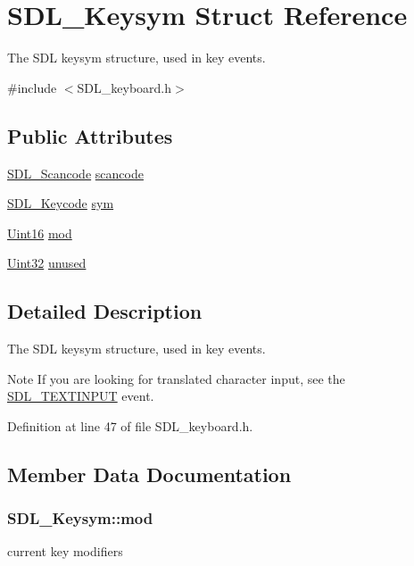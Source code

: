 \hypertarget{struct_s_d_l___keysym}{\section{S\-D\-L\-\_\-\-Keysym Struct Reference}
\label{struct_s_d_l___keysym}
}


The S\-D\-L keysym structure, used in key events.  




{\ttfamily \#include $<$S\-D\-L\-\_\-keyboard.\-h$>$}

\subsection*{Public Attributes}
\begin{DoxyCompactItemize}
\item 
\hyperlink{_s_d_l__scancode_8h_a82ab7cff701034fb40a47b5b3a02777b}{S\-D\-L\-\_\-\-Scancode} \hyperlink{struct_s_d_l___keysym_ad47e9120a511e2efc7ec0c6d8a5ec51e}{scancode}
\item 
\hyperlink{_s_d_l__keycode_8h_ae9265f064f13f0f74dfca26a67875171}{S\-D\-L\-\_\-\-Keycode} \hyperlink{struct_s_d_l___keysym_a082ff1fd787b79fa6c3a445deb225f08}{sym}
\item 
\hyperlink{_s_d_l__stdinc_8h_a31fcc0a076c9068668173ee26d33e42b}{Uint16} \hyperlink{struct_s_d_l___keysym_ab519d1b8a9939d3d035f7103f3208291}{mod}
\item 
\hyperlink{_s_d_l__stdinc_8h_add440eff171ea5f55cb00c4a9ab8672d}{Uint32} \hyperlink{struct_s_d_l___keysym_ab1d0a50cc619966fb06b92e15cc46dd9}{unused}
\end{DoxyCompactItemize}


\subsection{Detailed Description}
The S\-D\-L keysym structure, used in key events. 

\begin{DoxyNote}{Note}
If you are looking for translated character input, see the \hyperlink{_s_d_l__events_8h_a3b589e89be6b35c02e0dd34a55f3fccaa4fa2570088f6b9cbd109ae91b511368f}{S\-D\-L\-\_\-\-T\-E\-X\-T\-I\-N\-P\-U\-T} event. 
\end{DoxyNote}


Definition at line 47 of file S\-D\-L\-\_\-keyboard.\-h.



\subsection{Member Data Documentation}
\hypertarget{struct_s_d_l___keysym_ab519d1b8a9939d3d035f7103f3208291}{
\subsubsection[{mod}]{ S\-D\-L\-\_\-\-Keysym\-::mod}}\label{struct_s_d_l___keysym_ab519d1b8a9939d3d035f7103f3208291}
current key modifiers 

